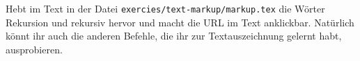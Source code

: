 Hebt im Text in der Datei \texttt{exercies/text-markup/markup.tex} die Wörter \glqq{}Rekursion\grqq{} und \glqq{}rekursiv\grqq{} hervor und macht die URL im Text anklickbar. Natürlich könnt ihr auch die anderen Befehle, die ihr zur Textauszeichnung gelernt habt, ausprobieren. 


